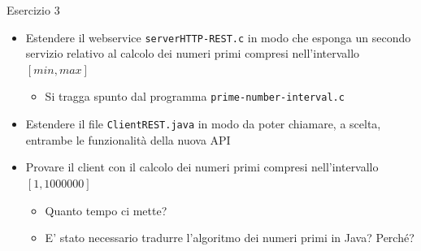 \documentclass[11pt]{article}
\begin{document}
\begin{tcolorbox}[colback=blue!5!white,colframe=blue!75!black,title=\textbf{DOMANDA}, breakable]
Esercizio 3
\begin{itemize}
    \item Estendere il webservice \texttt{serverHTTP-REST.c} in modo che esponga un secondo servizio relativo al calcolo dei numeri primi compresi nell'intervallo $[min, max]$
    \begin{itemize}
        \item Si tragga spunto dal programma \texttt{prime-number-interval.c}
    \end{itemize}
    \item Estendere il file \texttt{ClientREST.java} in modo da poter chiamare, a scelta, entrambe le funzionalità della nuova API
    \item Provare il client con il calcolo dei numeri primi compresi nell'intervallo $[1, 1000000]$
    \begin{itemize}
        \item Quanto tempo ci mette?
        \item E' stato necessario tradurre l'algoritmo dei numeri primi in Java? Perché?
    \end{itemize}
\end{itemize}
\end{tcolorbox}
\end{document}
